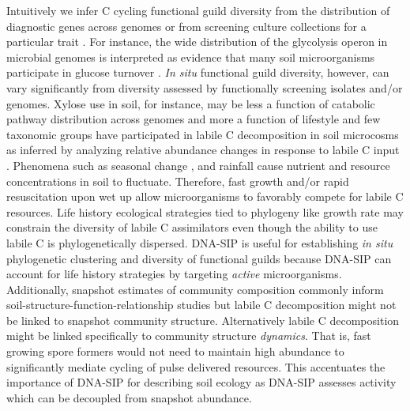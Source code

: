 Intuitively we infer C cycling functional guild diversity from the distribution
of diagnostic genes across genomes \citep{Berlemont2013} or from screening
culture collections for a particular trait \citep{Martiny2013}. For
instance, the wide distribution of the glycolysis operon in microbial
genomes is interpreted as evidence that many soil microorganisms
participate in glucose turnover \citep{McGuire2010}. \textit{In situ}
functional guild diversity, however, can vary significantly from diversity
assessed by functionally screening isolates and/or genomes. Xylose use in soil,
for instance, may be less a function of catabolic pathway distribution across
genomes and more a function of lifestyle and few taxonomic groups have
participated in labile C decomposition in soil microcosms as inferred by
analyzing relative abundance changes in response to labile C input
\citep{Eilers2010,Cleveland2007}. Phenomena such as seasonal change
\citep{Schmidt2007}, and rainfall \citep{Placella2012} cause nutrient and
resource concentrations in soil to fluctuate. Therefore, fast growth
and/or rapid resuscitation upon wet up \citep{Placella2012} allow
microorganisms to favorably compete for labile C resources. Life history
ecological strategies tied to phylogeny like growth rate
\citep{Fierer2007} may constrain the diversity of labile C assimilators
even though the ability to use labile C is phylogenetically dispersed.
DNA-SIP is useful for establishing \textit{in situ} phylogenetic
clustering and diversity of functional guilds because DNA-SIP can account
for life history strategies by targeting \textit{active} microorganisms.
Additionally, snapshot estimates of community composition commonly inform
soil-structure-function-relationship studies \citep{Fierer2007} but labile
C decomposition might not be linked to snapshot community structure.
Alternatively labile C decomposition might be linked specifically to
community structure \textit{dynamics}. That is, fast growing spore formers
would not need to maintain high abundance to significantly mediate cycling
of pulse delivered resources. This accentuates the importance of DNA-SIP
for describing soil ecology as DNA-SIP assesses activity which can be
decoupled from snapshot abundance.

